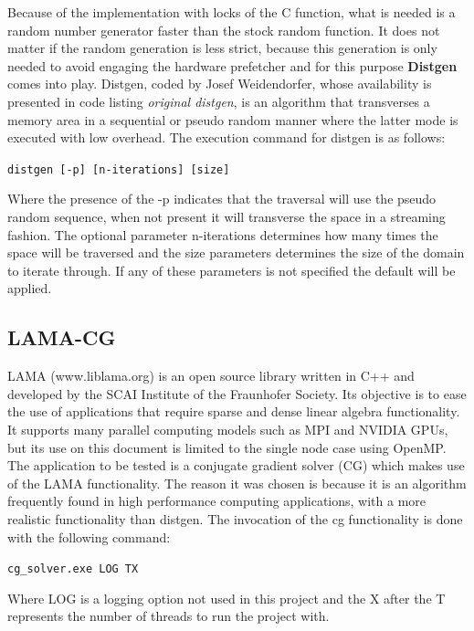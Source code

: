 Because of the implementation with locks of the C function, what is needed is a random number generator faster than the stock random function. It does not matter if the random generation is less strict, because this generation is only needed to avoid engaging the hardware prefetcher and for this purpose \textbf{Distgen} comes into play. Distgen, coded by Josef Weidendorfer, whose availability is presented in code listing \textit{original distgen}, is an algorithm that transverses a memory area in a sequential or pseudo random manner where the latter mode is executed with low overhead. The execution command for distgen is as follows:
\begin{center}
\texttt{distgen [-p] [n-iterations] [size]}
\end{center}

Where the presence of the -p indicates that the traversal will use the pseudo random sequence, when not present it will transverse the space in a streaming fashion. The optional parameter n-iterations determines how many times the space will be traversed and the size parameters determines the size of the domain to iterate through. If any of these parameters is not specified the default will be applied.

\subsection{LAMA-CG}\label{section:Lama}
LAMA (www.liblama.org) is an open source library written in C++ and developed by the SCAI Institute of the Fraunhofer Society. Its objective is to ease the use of applications that require sparse and dense linear algebra functionality. It supports many parallel computing models such as MPI and NVIDIA GPUs, but its use on this document is limited to the single node case using OpenMP. The application to be tested is a conjugate gradient solver (CG) which makes use of the LAMA functionality. The reason it was chosen is because it is an algorithm frequently found in high performance computing applications, with a more realistic functionality than distgen.
The invocation of the cg functionality is done with the following command:\\
\begin{center}
\texttt{cg\_solver.exe LOG TX}
\end{center}

Where LOG is a logging option not used in this project and the X after the T represents the number of threads to run the project with.

